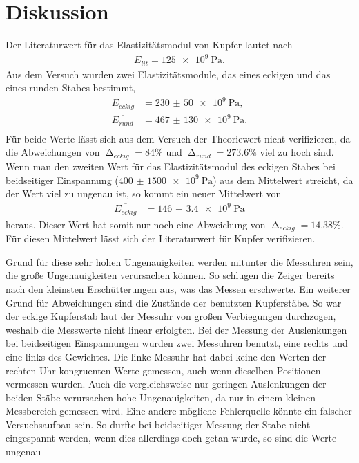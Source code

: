 \section{Diskussion}
\label{sec:Diskussion}

Der Literaturwert für das Elastizitätsmodul von Kupfer lautet nach \cite{czichos}
\begin{align*}
    E_{lit} = \SI{125e9}{\Pa}.
\end{align*}
Aus dem Versuch wurden zwei Elastizitätsmodule, das eines eckigen und das eines runden Stabes bestimmt,
\begin{align*}
    \overline{E_{eckig}} &= \SI{230(50)e9}{\Pa}, \\
    \overline{E_{rund}} &= \SI{467(130)e9}{\Pa}. \\
\end{align*}
Für beide Werte lässt sich aus dem Versuch der Theoriewert nicht verifizieren, da die Abweichungen von
$\upDelta_{eckig} = 84 \%$ und $\upDelta_{rund} = 273.6 \%$ viel zu hoch sind.
Wenn man den zweiten Wert für das Elastizitätsmodul des eckigen Stabes bei beidseitiger Einspannung ($\SI{400(1500)e9}{\Pa}$)
aus dem Mittelwert streicht, da der Wert viel zu ungenau ist, so kommt ein neuer Mittelwert von
\begin{align*}
    \overline{E_{eckig}} &= \SI{146(3.4)e9}{\Pa}
\end{align*}
heraus. Dieser Wert hat somit nur noch eine Abweichung von $\upDelta_{eckig} = 14.38 \%$.
Für diesen Mittelwert lässt sich der Literaturwert für Kupfer verifizieren.

Grund für diese sehr hohen Ungenauigkeiten werden mitunter die Messuhren sein, die große Ungenauigkeiten verursachen können.
So schlugen die Zeiger bereits nach den kleinsten Erschütterungen aus, was das Messen erschwerte. 
Ein weiterer Grund für Abweichungen sind die Zustände der benutzten Kupferstäbe. So war der eckige Kupferstab laut der Messuhr
von großen Verbiegungen durchzogen, weshalb die Messwerte nicht linear erfolgten.
Bei der Messung der Auslenkungen bei beidseitigen Einspannungen wurden zwei Messuhren benutzt, eine rechts und eine links des Gewichtes.
Die linke Messuhr hat dabei keine den Werten der rechten Uhr kongruenten Werte gemessen, auch wenn dieselben Positionen vermessen wurden.
Auch die vergleichsweise nur geringen Auslenkungen der beiden Stäbe verursachen hohe Ungenauigkeiten, da nur in einem
kleinen Messbereich gemessen wird.
Eine andere mögliche Fehlerquelle könnte ein falscher Versuchsaufbau sein. So durfte bei beidseitiger Messung der Stabe nicht
eingespannt werden, wenn dies allerdings doch getan wurde, so sind die Werte ungenau


